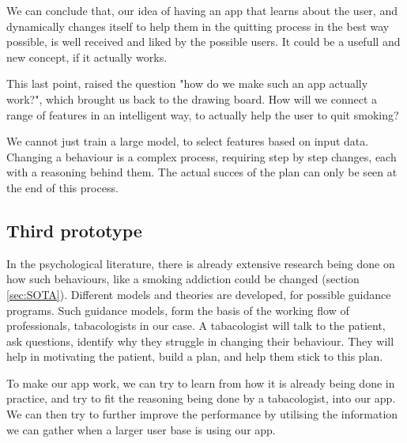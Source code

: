We can conclude that, our idea of having an app that learns about the user, 
and dynamically changes itself to help them in the quitting process in the best way possible, 
is well received and liked by the possible users.
It could be a usefull and new concept, if it actually works.

This last point, raised the question "how do we make such an app actually work?", which brought us back to the drawing board.
How will we connect a range of features in an intelligent way, to actually help the user to quit smoking?

We cannot just train a large model, to select features based on input data.
Changing a behaviour is a complex process, requiring step by step changes, each with a reasoning behind them.
The actual succes of the plan can only be seen at the end of this process.

\subsection{Third prototype}

In the psychological literature, there is already extensive research being done on how such behaviours, like a smoking addiction could be changed (section \ref{sec:SOTA}).
Different models and theories are developed, for possible guidance programs. 
Such guidance models, form the basis of the working flow of professionals, tabacologists in our case.
A tabacologist will talk to the patient, ask questions, identify why they struggle in changing their behaviour.
They will help in motivating the patient, build a plan, and help them stick to this plan.

To make our app work, we can try to learn from how it is already being done in practice, 
and try to fit the reasoning being done by a tabacologist, into our app. 
We can then try to further improve the performance by utilising the information we can gather when a larger user base is using our app.

